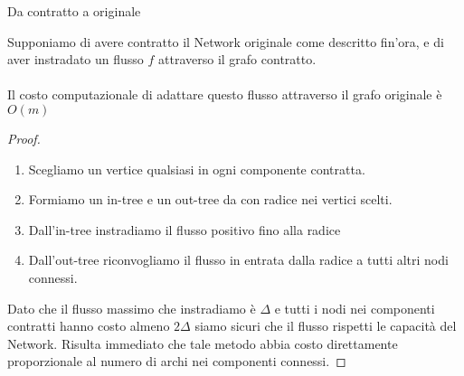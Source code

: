     \begin{lemma}[label = fixCont]{Da contratto a originale}{}
        
        Supponiamo di avere contratto il Network originale come descritto fin'ora, e di aver instradato un flusso $f$ attraverso il grafo contratto.
        \paragraph*{}
        Il costo computazionale di adattare questo flusso attraverso il grafo originale è $O(m)$
    \end{lemma}
    \begin{proof}\begin{enumerate}[nolistsep]
        \item Scegliamo un vertice qualsiasi in ogni componente contratta.
        \item Formiamo un in-tree e un out-tree da con radice nei vertici scelti. 
        \item Dall'in-tree instradiamo il flusso positivo fino alla radice 
        \item Dall'out-tree riconvogliamo il flusso in entrata dalla radice a tutti altri nodi connessi.
    \end{enumerate}
    Dato che il flusso massimo che instradiamo è $\Delta$ e tutti i nodi nei componenti contratti hanno costo almeno $2\Delta$ siamo sicuri che il flusso rispetti le capacità del Network.
    Risulta immediato che tale metodo abbia costo direttamente proporzionale al numero di archi nei componenti connessi.
    \QED
    \end{proof}

